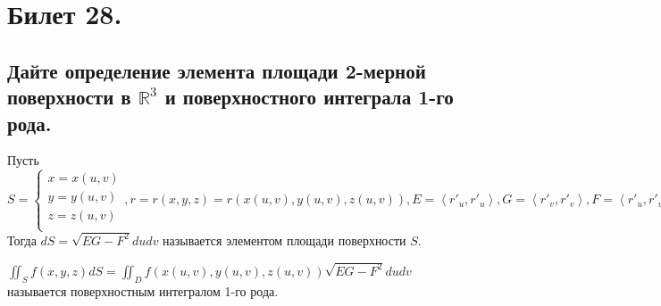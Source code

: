 \section{Билет 28.}

\subsection{Дайте определение элемента площади 2-мерной поверхности в $\mathbb{R}^3$ и поверхностного интеграла 1-го рода.}
\begin{definition}
    Пусть
    \[
        S = \begin{cases}
            x = x(u,v) \\
            y = y(u,v) \\
            z = z(u,v) \\
        \end{cases},
        r = r(x,y,z) = r(x(u,v),y(u,v),z(u,v)),
        E = \left<
            r'_u, r'_u
        \right>,
        G = \left<
            r'_v, r'_v
        \right>,
        F = \left<
            r'_u, r'_v
        \right>.
    \]
    Тогда $dS = \sqrt{EG - F^2} du dv$ называется элементом площади поверхности $S$.
\end{definition}
\begin{definition}
    $\iint_S f(x,y,z) dS = \iint_D f(x(u,v),y(u,v),z(u,v)) \sqrt{EG - F^2} du dv$ называется поверхностным интегралом 1-го рода.
\end{definition}
